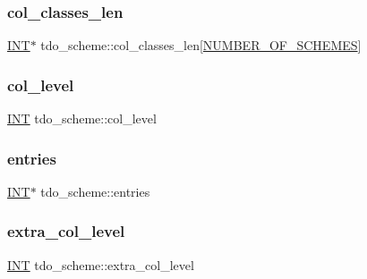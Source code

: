 \subsubsection{\texorpdfstring{col\+\_\+classes\+\_\+len}{col\_classes\_len}}
{\footnotesize\ttfamily \mbox{\hyperlink{galois_8h_a09fddde158a3a20bd2dcadb609de11dc}{I\+NT}}$\ast$ tdo\+\_\+scheme\+::col\+\_\+classes\+\_\+len\mbox{[}\mbox{\hyperlink{incidence_8h_a27f25725c4772efe473058135daeba55}{N\+U\+M\+B\+E\+R\+\_\+\+O\+F\+\_\+\+S\+C\+H\+E\+M\+ES}}\mbox{]}}

\mbox{\label{classtdo__scheme_a267a1d027bb365ae95141a8d7b6bbc35}} 
\subsubsection{\texorpdfstring{col\+\_\+level}{col\_level}}
{\footnotesize\ttfamily \mbox{\hyperlink{galois_8h_a09fddde158a3a20bd2dcadb609de11dc}{I\+NT}} tdo\+\_\+scheme\+::col\+\_\+level}

\mbox{\label{classtdo__scheme_ae4ca55108570de285018959258103fb3}} 
\subsubsection{\texorpdfstring{entries}{entries}}
{\footnotesize\ttfamily \mbox{\hyperlink{galois_8h_a09fddde158a3a20bd2dcadb609de11dc}{I\+NT}}$\ast$ tdo\+\_\+scheme\+::entries}

\mbox{\label{classtdo__scheme_a232d0e70309ec0a07a706529ef9d3dda}} 
\subsubsection{\texorpdfstring{extra\+\_\+col\+\_\+level}{extra\_col\_level}}
{\footnotesize\ttfamily \mbox{\hyperlink{galois_8h_a09fddde158a3a20bd2dcadb609de11dc}{I\+NT}} tdo\+\_\+scheme\+::extra\+\_\+col\+\_\+level}

